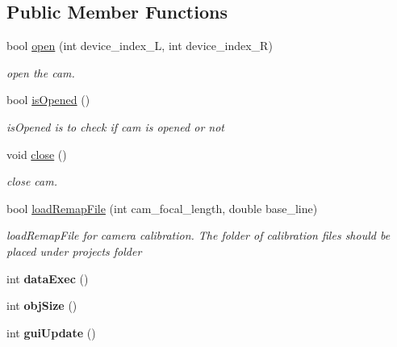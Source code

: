 \subsection*{Public Member Functions}
\begin{DoxyCompactItemize}
\item 
bool \hyperlink{classstereo__vision_a5f10ebe6877fa06685259e7a14146857}{open} (int device\+\_\+index\+\_\+\+L, int device\+\_\+index\+\_\+\+R)
\begin{DoxyCompactList}\small\item\em open the cam. \end{DoxyCompactList}\item 
bool \hyperlink{classstereo__vision_a42d70e087c25b7b91d989b0f182f7efe}{is\+Opened} ()
\begin{DoxyCompactList}\small\item\em is\+Opened is to check if cam is opened or not \end{DoxyCompactList}\item 
\hypertarget{classstereo__vision_aa6323301b9c2a27f2bb01204dbca05f7}{}void \hyperlink{classstereo__vision_aa6323301b9c2a27f2bb01204dbca05f7}{close} ()\label{classstereo__vision_aa6323301b9c2a27f2bb01204dbca05f7}

\begin{DoxyCompactList}\small\item\em close cam. \end{DoxyCompactList}\item 
bool \hyperlink{classstereo__vision_a4d98bb5b8d89b9e085e21e3f687ab65c}{load\+Remap\+File} (int cam\+\_\+focal\+\_\+length, double base\+\_\+line)
\begin{DoxyCompactList}\small\item\em load\+Remap\+File for camera calibration. The folder of calibration files should be placed under project\textquotesingle{}s folder \end{DoxyCompactList}\item 
\hypertarget{classstereo__vision_af824225e48b0db6e7b2e97c36e947cd8}{}int {\bfseries data\+Exec} ()\label{classstereo__vision_af824225e48b0db6e7b2e97c36e947cd8}

\item 
\hypertarget{classstereo__vision_aac6e3f56cebb6c9db27e1f1ce96cf002}{}int {\bfseries obj\+Size} ()\label{classstereo__vision_aac6e3f56cebb6c9db27e1f1ce96cf002}

\item 
\hypertarget{classstereo__vision_a7b9aacf6f82eb8d38836bd1ad0a88873}{}int {\bfseries gui\+Update} ()\label{classstereo__vision_a7b9aacf6f82eb8d38836bd1ad0a88873}


\end{DoxyCompactItemize}
